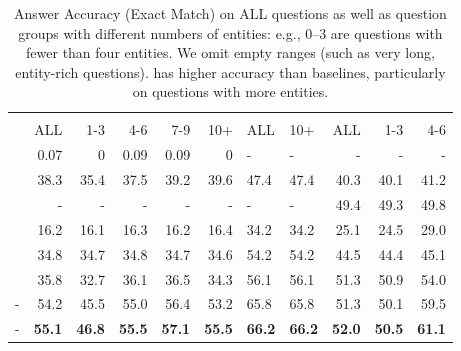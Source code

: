 \begin{table*}[t]
  \centering
  \begin{tabular}{lrrrrr gg rrr}
      &  &
                                                  &   \\ 
      & ALL
      & 1-3 & 4-6 & 7-9 & 10+ 
      & ALL
      & 10+
      & ALL
      & 1-3  & 4-6   \\ \toprule
    \quest{} & 0.07 & 0 & 0.09 & 0.09& 0& -&- &- &-&-\\ 
    \drqa{} & 38.3 &  35.4 & 37.5 & 39.2 & 39.6
    &  47.4 & 47.4
    &  40.3 &40.1 & 41.2 \\ 
     \docqa{} & - &- & - &- &-&-
    & - 
    & 49.4 & 49.3 & 49.8 \\ \hline
    \bertet{} & 16.2  & 16.1& 16.3&16.2 &16.4
    &  34.2 & 34.2
     & 25.1 &24.5 & 29.0 \\ 
    \bertsent{} & 34.8  & 34.7& 34.8& 34.7&34.6
    & 54.2 & 54.2
    & 44.5 &44.4 &45.1  \\  
    \memnn{} & 35.8 & 32.7 & 36.1 & 36.5& 34.3
    &  56.1 & 56.1
    & 51.3 & 50.9& 54.0\\
    \midrule
    \name{}-\glove{} & 54.2 & 45.5 & 55.0 & 56.4 & 53.2
    &   65.8 & 65.8
    &  51.3 & 50.1 & 59.5 \\ 
    \name{}-\bert{}  
    & \textbf{55.1} & \textbf{46.8} & \textbf{55.5} & \textbf{57.1} & \textbf{55.5}
    &   \textbf{66.2}  & \textbf{66.2}
    & \textbf{52.0}  &\textbf{ 50.5} & \textbf{61.1} \\
    \bottomrule
  \end{tabular}
  \caption{Answer Accuracy (Exact Match) on ALL questions as well as
    question groups with different numbers of entities: e.g., 0--3 are
    questions with fewer than four entities.  We omit empty ranges
    (such as very long, entity-rich \qb{} questions).  \name{} has
    higher accuracy than baselines, particularly on questions with
    more entities.}

  \label{tab:results}

\end{table*}




